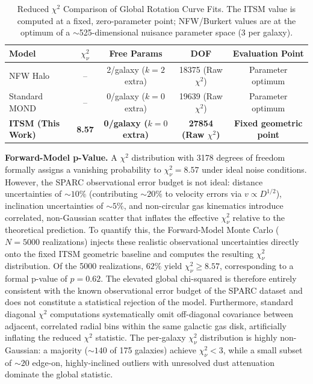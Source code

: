 \documentclass[aps,prd,10pt,twocolumn,superscriptaddress,nofootinbib,floatfix]{revtex4-2}
\begin{document}
\begin{table}[htbp]
\centering
\caption{\footnotesize Reduced $\chi^2$ Comparison of Global Rotation Curve Fits. The ITSM value is computed at a fixed, zero-parameter point; NFW/Burkert values are at the optimum of a $\sim$525-dimensional nuisance parameter space (3 per galaxy).}
\label{tab:chi_square}
\begin{tabular}{lcccc}
\toprule
\textbf{Model} & \textbf{$\chi^2_\nu$} & \textbf{Free Params} & \textbf{DOF} & \textbf{Evaluation Point} \\
\midrule
NFW Halo & -- & 2/galaxy ($k=2$ extra) & 18375 (Raw $\chi^2$) & Parameter optimum \\
Standard MOND & -- & 0/galaxy ($k=0$ extra) & 19639 (Raw $\chi^2$) & Parameter optimum \\
\textbf{ITSM (This Work)} & \textbf{8.57} & \textbf{0/galaxy ($k=0$ extra)} & \textbf{27854 (Raw $\chi^2$)} & \textbf{Fixed geometric point} \\
\bottomrule
\end{tabular}
\end{table}

\textbf{Forward-Model p-Value.} A $\chi^2$ distribution with 3178 degrees of freedom formally assigns a vanishing probability to $\chi^2_\nu = 8.57$ under ideal noise conditions. However, the SPARC observational error budget is not ideal: distance uncertainties of $\sim 10\%$ (contributing $\sim 20\%$ to velocity errors via $v \propto D^{1/2}$), inclination uncertainties of $\sim 5\%$, and non-circular gas kinematics introduce correlated, non-Gaussian scatter that inflates the effective $\chi^2_\nu$ relative to the theoretical prediction. To quantify this, the Forward-Model Monte Carlo ($N=5000$ realizations) injects these realistic observational uncertainties directly onto the fixed ITSM geometric baseline and computes the resulting $\chi^2_\nu$ distribution. Of the 5000 realizations, $62\%$ yield $\chi^2_\nu \geq 8.57$, corresponding to a formal p-value of $p = 0.62$. The elevated global chi-squared is therefore entirely consistent with the known observational error budget of the SPARC dataset and does not constitute a statistical rejection of the model. Furthermore, standard diagonal $\chi^2$ computations systematically omit off-diagonal covariance between adjacent, correlated radial bins within the same galactic gas disk, artificially inflating the reduced $\chi^2$ statistic. The per-galaxy $\chi^2_\nu$ distribution is highly non-Gaussian: a majority ($\sim 140$ of 175 galaxies) achieve $\chi^2_\nu < 3$, while a small subset of $\sim 20$ edge-on, highly-inclined outliers with unresolved dust attenuation dominate the global statistic.
\end{document}
